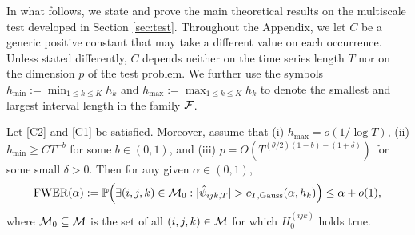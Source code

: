 \documentclass[a4paper,12pt]{article}
\numberwithin{equation}{section}
\begin{document}
\enlargethispage{0.1cm}


In what follows, we state and prove the main theoretical results on the multiscale test developed in Section \ref{sec:test}. Throughout the Appendix, we let $C$ be a generic positive constant that may take a different value on each occurrence. Unless stated differently, $C$ depends neither on the time series length $T$ nor on the dimension $p$ of the test problem. We further use the symbols $h_{\min}:= \min_{1 \le k \le K} h_k$ and $h_{\max} := \max_{1 \le k \le K} h_k$ to denote the smallest and largest interval length in the family $\mathcal{F}$. 


\begin{theoremA}\label{theo1}
Let \ref{C2} and \ref{C1} be satisfied. Moreover, assume that (i) $h_{\max} = o(1/\log T)$, (ii) $h_{\min} \ge CT^{-b}$ for some $b \in (0,1)$, and (iii) $p = O(T^{(\theta/2)(1-b)-(1+\delta)})$ for some small $\delta > 0$. Then for any given $\alpha \in (0,1)$,
\[ \textnormal{FWER}(\alpha) := \mathbb{P} \Big( \exists (i,j,k) \in \mathcal{M}_0: |\hat{\psi}_{ijk,T}| > c_{T,\textnormal{Gauss}}(\alpha,h_k) \Big) \le \alpha + o(1), \]
where $\mathcal{M}_0 \subseteq \mathcal{M}$ is the set of all $(i,j,k) \in \mathcal{M}$ for which $H_0^{(ijk)}$ holds true. 
\end{theoremA}
\end{document}
